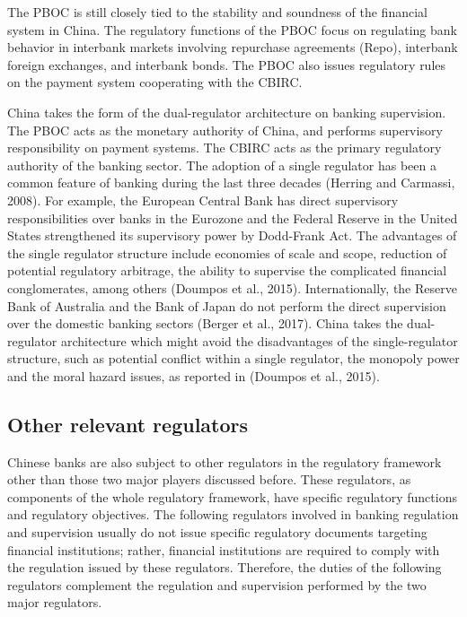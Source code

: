 \documentclass[
  letterpaper,
  DIV=11,
  numbers=noendperiod]{scrreprt}
\begin{document}
The PBOC is still closely tied to the stability and soundness of the
financial system in China. The regulatory functions of the PBOC focus on
regulating bank behavior in interbank markets involving repurchase
agreements (Repo), interbank foreign exchanges, and interbank bonds. The
PBOC also issues regulatory rules on the payment system cooperating with
the CBIRC.

China takes the form of the dual-regulator architecture on banking
supervision. The PBOC acts as the monetary authority of China, and
performs supervisory responsibility on payment systems. The CBIRC acts
as the primary regulatory authority of the banking sector. The adoption
of a single regulator has been a common feature of banking during the
last three decades (Herring and Carmassi, 2008). For example, the
European Central Bank has direct supervisory responsibilities over banks
in the Eurozone and the Federal Reserve in the United States
strengthened its supervisory power by Dodd-Frank Act. The advantages of
the single regulator structure include economies of scale and scope,
reduction of potential regulatory arbitrage, the ability to supervise
the complicated financial conglomerates, among others (Doumpos et al.,
2015). Internationally, the Reserve Bank of Australia and the Bank of
Japan do not perform the direct supervision over the domestic banking
sectors (Berger et al., 2017). China takes the dual-regulator
architecture which might avoid the disadvantages of the single-regulator
structure, such as potential conflict within a single regulator, the
monopoly power and the moral hazard issues, as reported in (Doumpos et
al., 2015).

\subsection{Other relevant regulators}\label{other-relevant-regulators}

Chinese banks are also subject to other regulators in the regulatory
framework other than those two major players discussed before. These
regulators, as components of the whole regulatory framework, have
specific regulatory functions and regulatory objectives. The following
regulators involved in banking regulation and supervision usually do not
issue specific regulatory documents targeting financial institutions;
rather, financial institutions are required to comply with the
regulation issued by these regulators. Therefore, the duties of the
following regulators complement the regulation and supervision performed
by the two major regulators.
\end{document}
